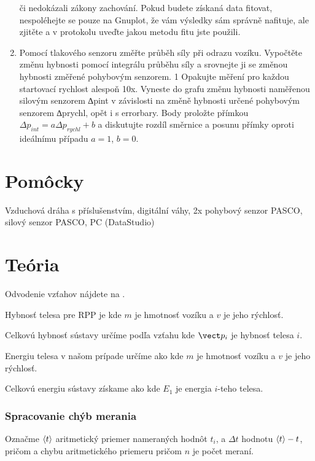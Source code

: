 \documentclass[a4paper,10pt]{article}
\begin{document}
\begin{enumerate}
či nedokázali zákony zachování. Pokud budete získaná data fitovat, nespoléhejte se pouze na
Gnuplot, že vám výsledky sám správně nafituje, ale zjitěte a v protokolu uveďte jakou metodu
fitu jste použili.
\item Pomocí tlakového senzoru změřte průběh síly při odrazu vozíku. Vypočtěte změnu hybnosti
pomocí integrálu průběhu síly a srovnejte ji se změnou hybnosti změřené pohybovým senzorem.
1
Opakujte měření pro každou startovací rychlost alespoň 10x. Vyneste do grafu změnu hybnosti
naměřenou silovým senzorem ∆pint v závislosti na změně hybnosti určené pohybovým senzorem
∆prychl, opět i s errorbary. Body proložte přímkou $\Delta p_{int} = a \Delta p_{rychl} + b$ a diskutujte rozdíl
směrnice a posunu přímky oproti ideálnímu případu $a = 1$, $b = 0$.

\end{enumerate}



\section{Pomôcky}
Vzduchová dráha s příslušenstvím, digitální váhy, 2x pohybový senzor PASCO, silový
senzor PASCO, PC (DataStudio)

\section{Teória}
Odvodenie vzťahov nájdete na \cite{C_1}.

Hybnosť telesa pre RPP je 
kde $m$ je hmotnosť vozíku a $v$ je jeho rýchlosť.

Celkovú hybnosť sústavy určíme podľa vzťahu
kde $\vect p_i$ je hybnosť telesa $i$.

Energiu telesa v našom prípade určíme ako
kde $m$ je hmotnosť vozíku a $v$ je jeho rýchlosť.

Celkovú energiu sústavy získame ako 
kde $E_1$ je energia $i$-teho telesa.



\subsubsection{Spracovanie chýb merania}

Označme $\left< t \right>$ aritmetický priemer nameraných hodnôt $t_i$, a $\Delta t$ hodnotu $\left< t \right>-t$, pričom 
a chybu aritmetického priemeru 
pričom $n$ je počet meraní.
\end{document}

